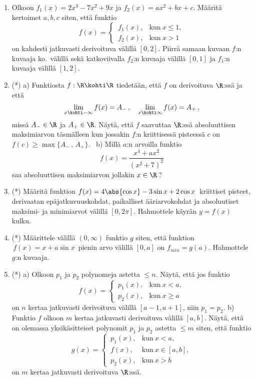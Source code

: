 \begin{enumerate}
\item
Olkoon $f_1(x)=2x^3-7x^2+9x$ ja $f_2(x)=ax^2+bx+c$. Määritä kertoimet $a,b,c$ siten, että 
funktio
\[
f(x)=\begin{cases}
     \,f_1(x),  &\text{kun}\ x \le 1, \\ \,f_2(x),  &\text{kun}\ x>1
     \end{cases}
\]
on kahdesti jatkuvasti derivoituva välillä $[0,2]$. Piirrä samaan kuvaan $f$:n kuvaaja ko.\
välillä sekä katkoviivalla $f_2$:n kuvaaja välillä $[0,1]$ ja $f_1$:n kuvaaja välillä $[1,2]$.

\item (*)
a) Funktiosta $f: \R \kohti \R$ tiedetään, että $f$ on derivoituva $\R$:ssä ja että
\[
\lim_{x \kohti -\infty} f(x)=A_-\,, \quad \lim_{x \kohti\infty} f(x)=A_+\,,
\]
missä $A_-\in\R$ ja $A_+\in\R$. Näytä, että $f$ saavuttaa $\R$:ssä absoluuttisen
maksimiarvon täsmälleen kun jossakin $f$:n kriittisessä pisteessä $c$ on \newline
$f(c) \ge \max\{A_-\,,\,A_+\}$. \ b) Millä $a$:n arvoilla funktio
\[
f(x)=\frac{x^4+ax^2}{(x^2+7)^2}
\]
saa absoluuttisen maksimiarvon jollakin $x\in\R$\,?

\item (*)
Määritä funktion $f(x)=4\abs{\cos x}-3\sin x+2\cos x\,$ kriittiset pisteet, derivaatan
epäjatkuvuuskohdat, paikalliset ääriarvokohdat ja absoluutiset maksimi- ja minimiarvot
välillä $[0,2\pi]$. Hahmottele käyrän $y=f(x)$ kulku.

\item (*)
Määrittele välillä $(0,\infty)$ funktio $g$ siten, että funktion $\,f(x)=x+a\sin x\,$
pienin arvo välillä $[0,a]$ on $f_{min}=g(a)$. Hahmottele $g$:n kuvaaja.

\item (*) \label{H-V-5: jatkaminen polynomeilla}
a) Olkoon $p_1$ ja $p_2$ polynomeja astetta $\le n$. Näytä, että jos funktio
\[
f(x)=\begin{cases}
     \,p_1(x),  &\text{kun}\ x<a,  \\ \,p_2(x),  &\text{kun}\ x \ge a
     \end{cases}
\]
on $n$ kertaa jatkuvasti derivoituva välillä $[a-1,a+1]$, niin $p_1=p_2$.\vspace{1mm}\newline
b) Funktio $f$ olkoon $m$ kertaa jatkuvasti derivoituva välillä $[a,b]$. Näytä, että on
olemassa yksikäsitteiset polynomit $p_1$ ja $p_2$ astetta $\le m$ siten, että funktio
\[
g(x) = \begin{cases}
       \,p_1(x), &\text{kun}\ x<a, \\ 
       \,f(x), &\text{kun}\ x\in[a,b], \\ 
       \,p_2(x), &\text{kun}\ x>b
       \end{cases}
\]
on $m$ kertaa jatkuvasti derivoituva $\R$:ssä.


\end{enumerate}
